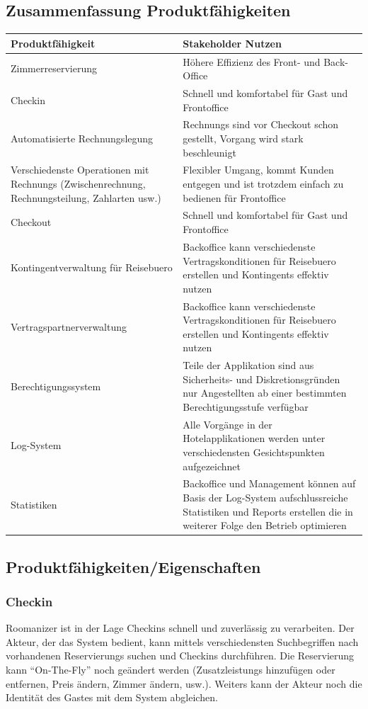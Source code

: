 \documentclass[10pt,a4paper,titlepage]{article}
\begin{document}
\subsection{Zusammenfassung Produktfähigkeiten}
\begin{tabular}{|p{5.7cm}|p{5.7cm}|}
	\hline
	\textbf{Produktfähigkeit} &
	\textbf{Stakeholder Nutzen}
	\\
	\hline
	Zimmerreservierung &
	Höhere Effizienz des Front- und Back-Office
	\\
	\hline
	\Gls{Checkin} &
	Schnell und komfortabel für \Gls{Gast} und \Gls{Frontoffice}
	\\
	\hline
	Automatisierte Rechnungslegung &
	\Glspl{Rechnung} sind vor \Gls{Checkout} schon gestellt, Vorgang wird stark beschleunigt
	\\
	\hline
	Verschiedenste Operationen mit \Glspl{Rechnung} (\Gls{Zwischenrechnung}, Rechnungsteilung, Zahlarten usw.) &
	Flexibler Umgang, kommt \Gls{Kunde}n entgegen und ist trotzdem einfach zu bedienen für \Gls{Frontoffice}
	\\
	\hline
	\Gls{Checkout} &
	Schnell und komfortabel für Gast und \Gls{Frontoffice}
	\\
	\hline
	Kontingentverwaltung für \Gls{Reisebuero} &
	\Gls{Backoffice} kann verschiedenste Vertragskonditionen für \Gls{Reisebuero} erstellen und \Glspl{Kontingent} effektiv nutzen
	\\
	\hline
	Vertragspartnerverwaltung &
	\Gls{Backoffice} kann verschiedenste Vertragskonditionen für \Gls{Reisebuero} erstellen und \Glspl{Kontingent} effektiv nutzen
	\\
	\hline
	Berechtigungssystem &
	Teile der Applikation sind aus Sicherheits- und Diskretionsgründen nur Angestellten ab einer bestimmten Berechtigungsstufe verfügbar
	\\
	\hline
	Log-System &
	Alle Vorgänge in der Hotelapplikationen werden unter verschiedensten Gesichtspunkten aufgezeichnet
	\\
	\hline
	Statistiken &
	\Gls{Backoffice} und Management können auf Basis der Log-System aufschlussreiche Statistiken und \Glspl{Report} erstellen die in weiterer Folge den Betrieb optimieren
	\\
	\hline
\end{tabular}

\subsection{Produktfähigkeiten/Eigenschaften}
\subsubsection{\Gls{Checkin}}
Roomanizer ist in der Lage \Glspl{Checkin} schnell und zuverlässig zu verarbeiten. Der Akteur, der das System bedient, kann mittels  verschiedensten Suchbegriffen nach vorhandenen \Glspl{Reservierung} suchen und \Glspl{Checkin} durchführen. Die \Gls{Reservierung} kann "`On-The-Fly"' noch geändert werden (\Glspl{Zusatzleistung} hinzufügen oder entfernen, Preis ändern, \Gls{Zimmer} ändern, usw.). Weiters kann der Akteur noch die Identität des \Gls{Gast}es mit dem System abgleichen.
\end{document}
